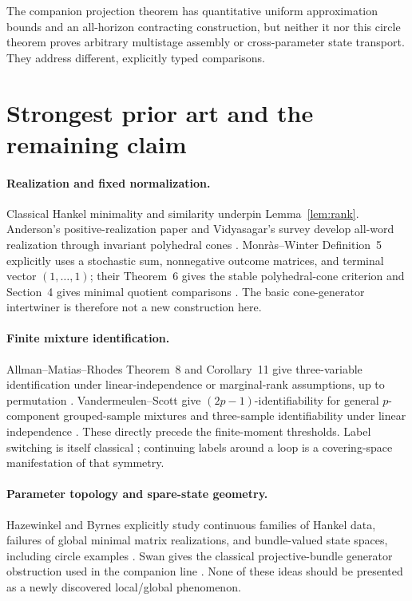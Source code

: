 \documentclass[11pt]{article}
\theoremstyle{definition}\newtheorem{definition}[theorem]{Definition}
\theoremstyle{remark}\newtheorem{remark}[theorem]{Remark}
\begin{document}
The companion projection theorem has quantitative uniform approximation bounds and an all-horizon contracting construction, but neither it nor this circle theorem proves arbitrary multistage assembly or cross-parameter state transport. They address different, explicitly typed comparisons.

\section{Strongest prior art and the remaining claim}
\paragraph{Realization and fixed normalization.}
Classical Hankel minimality and similarity underpin Lemma~\ref{lem:rank}. Anderson's positive-realization paper and Vidyasagar's survey develop all-word realization through invariant polyhedral cones \cite{Anderson,Vidyasagar}. Monr\`as--Winter Definition~5 explicitly uses a stochastic sum, nonnegative outcome matrices, and terminal vector $(1,\ldots,1)$; their Theorem~6 gives the stable polyhedral-cone criterion and Section~4 gives minimal quotient comparisons \cite{MW}. The basic cone-generator intertwiner is therefore not a new construction here.

\paragraph{Finite mixture identification.}
Allman--Matias--Rhodes Theorem~8 and Corollary~11 give three-variable identification under linear-independence or marginal-rank assumptions, up to permutation \cite{AMR}. Vandermeulen--Scott give $(2p-1)$-identifiability for general $p$-component grouped-sample mixtures and three-sample identifiability under linear independence \cite{VS}. These directly precede the finite-moment thresholds. Label switching is itself classical \cite{Stephens}; continuing labels around a loop is a covering-space manifestation of that symmetry.

\paragraph{Parameter topology and spare-state geometry.}
Hazewinkel and Byrnes explicitly study continuous families of Hankel data, failures of global minimal matrix realizations, and bundle-valued state spaces, including circle examples \cite{Hazewinkel,Byrnes}. Swan gives the classical projective-bundle generator obstruction used in the companion line \cite{Swan}. None of these ideas should be presented as a newly discovered local/global phenomenon.
\end{document}
